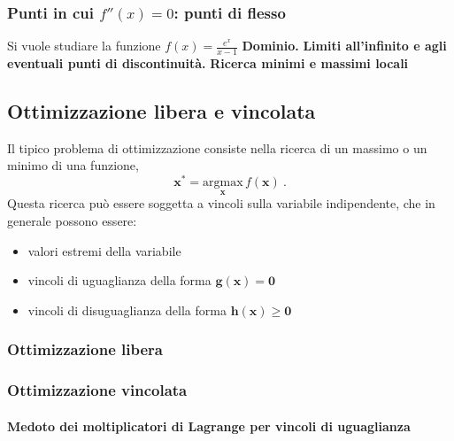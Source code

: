 \subsubsection{Punti in cui $f''(x) = 0$: punti di flesso}

\begin{example} Si vuole studiare la funzione $f(x) = \frac{e^x}{x-1}$
    \newline\textbf{Dominio.}
    \newline\textbf{Limiti all'infinito e agli eventuali punti di discontinuità.}
    \newline\textbf{Ricerca minimi e massimi locali}
\end{example}

\subsection{Ottimizzazione libera e vincolata}
Il tipico problema di ottimizzazione consiste nella ricerca di un massimo o un minimo di una funzione,
\begin{equation}
    \mathbf{x}^* = \underset{\mathbf{x}}{\text{argmax}} \, f(\mathbf{x}) \ .
\end{equation}
Questa ricerca può essere soggetta a vincoli sulla variabile indipendente, che in generale possono essere:
\begin{itemize}
    \item valori estremi della variabile
    \item vincoli di uguaglianza della forma $\mathbf{g}(\mathbf{x}) = \mathbf{0}$
    \item vincoli di disuguaglianza della forma $\mathbf{h}(\mathbf{x}) \ge \mathbf{0}$
\end{itemize}

\subsubsection{Ottimizzazione libera}

\subsubsection{Ottimizzazione vincolata}

\paragraph{Medoto dei moltiplicatori di Lagrange per vincoli di uguaglianza}



